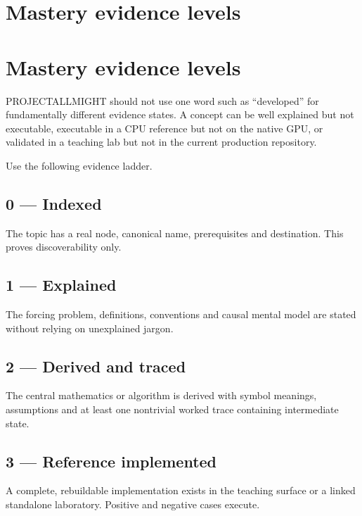 \hypertarget{appendix-2a2e5bd7143a}{}
\section*{Mastery evidence levels}
\section{Mastery evidence levels}\label{appendix-2a2e5bd7143a-mastery-evidence-levels}

PROJECTALLMIGHT should not use one word such as ``developed'' for fundamentally different evidence states. A concept can be well explained but not executable, executable in a CPU reference but not on the native GPU, or validated in a teaching lab but not in the current production repository.

Use the following evidence ladder.

\subsection{0 --- Indexed}\label{appendix-2a2e5bd7143a-indexed}

The topic has a real node, canonical name, prerequisites and destination. This proves discoverability only.

\subsection{1 --- Explained}\label{appendix-2a2e5bd7143a-explained}

The forcing problem, definitions, conventions and causal mental model are stated without relying on unexplained jargon.

\subsection{2 --- Derived and traced}\label{appendix-2a2e5bd7143a-derived-and-traced}

The central mathematics or algorithm is derived with symbol meanings, assumptions and at least one nontrivial worked trace containing intermediate state.

\subsection{3 --- Reference implemented}\label{appendix-2a2e5bd7143a-reference-implemented}

A complete, rebuildable implementation exists in the teaching surface or a linked standalone laboratory. Positive and negative cases execute.

